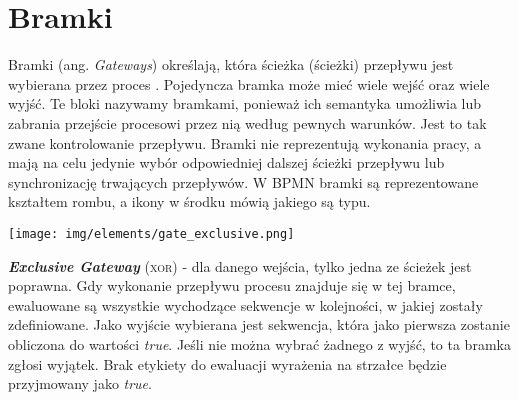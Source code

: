 \documentclass[declaration,shortabstract,mgr]{iithesis}
\newcommand{\bpmn}{BPMN }
\begin{document}
\section{Bramki}

Bramki (ang. \textit{Gateways}) określają, która ścieżka (ścieżki) przepływu jest wybierana przez proces \cite{bruce-silver-bpmn-gateways}. Pojedyncza bramka może mieć wiele wejść oraz wiele wyjść. Te bloki nazywamy bramkami, ponieważ ich semantyka umożliwia lub zabrania przejście procesowi przez nią według pewnych warunków. Jest to tak zwane kontrolowanie przepływu. Bramki nie reprezentują wykonania pracy, a mają na celu jedynie wybór odpowiedniej dalszej ścieżki przepływu lub synchronizację trwających przepływów. W \bpmn bramki są reprezentowane kształtem rombu, a ikony w środku mówią jakiego są typu.



\noindent\begin{minipage}[t]{0.075\textwidth}\vspace{0pt}
\texttt{[image: img/elements/gate\_exclusive.png]}
\end{minipage}\hfill
\begin{minipage}[t]{0.875\textwidth}\vspace{0pt}
\textbf{\textit{Exclusive Gateway}} (\textsc{xor}) - dla danego wejścia, tylko jedna ze ścieżek jest poprawna. Gdy wykonanie przepływu procesu znajduje się w tej bramce, ewaluowane są wszystkie wychodzące sekwencje w kolejności, w jakiej zostały zdefiniowane. Jako wyjście wybierana jest sekwencja, która jako pierwsza zostanie obliczona do wartości \textit{true}. Jeśli nie można wybrać żadnego z wyjść, to ta bramka zgłosi wyjątek. Brak etykiety do ewaluacji wyrażenia na strzałce będzie przyjmowany jako \textit{true}.
\end{minipage}

\vspace{\mypointsep}
\end{document}

